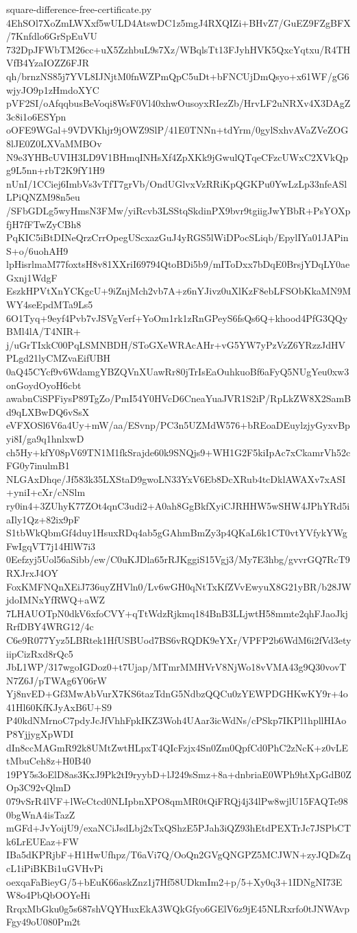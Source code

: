 \documentclass[11pt]{article}
\theoremstyle{definition}
\theoremstyle{remark}
\begin{document}
\begin{filecontents*}[overwrite]{square-difference-free-certificate.py}
4EhSOl7XoZmLWXxf5wULD4AtswDC1z5mgJ4RXQIZi+BHvZ7/GuEZ9FZgBFX/7Knfdlo6GrSpEuVU
732DpJFWbTM26cc+uX5ZzhbuL9s7Xz/WBqlsTt13FJyhHVK5QxcYqtxu/R4THVfB4YzaIOZZ6FJR
qh/brnzNS85j7YVL8IJNjtM0fnWZPmQpC5uDt+bFNCUjDmQsyo+x61WF/gG6wjyJO9p1zHmdoXYC
pVF2SI/oAfqqbusBeVoqi8WsF0Vl40xhwOusoyxRIezZb/HrvLF2uNRXv4X3DAgZ3c8i1o6ESYpn
oOFE9WGal+9VDVKhjr9jOWZ9SlP/41E0TNNn+tdYrm/0gylSxhvAVaZVeZOG8lJE0Z0LXVaMMBOv
N9e3YHBcUVIH3LD9V1BHmqINHsXf4ZpXKk9jGwulQTqeCFzcUWxC2XVkQpg9L5nn+rbT2K9fY1H9
nUnI/1CCiej6ImbVs3vTfT7grVb/OndUGlvxVzRRiKpQGKPu0YwLzLp33nfeASlLPiQNZM98n5eu
/SFbGDLg5wyHmsN3FMw/yiRcvb3LSStqSkdinPX9bvr9tgiigJwYBbR+PsYOXpfjH7fFTwZyCBh8
PqKIC5iBtDINeQrzCrrOpegUScxazGuJ4yRGS5lWiDPocSLiqb/EpylIYa01JAPinS+o/6uohAH9
lpHisrlmaM77foxtsH8v81XXriI69794QtoBDi5b9/mIToDxx7bDqE0BrsjYDqLY0aeGxnj1WdgF
EszkHPVtXnYCKgcU+9iZnjMch2vb7A+z6nYJivz0uXlKzF8ebLFSObKkaMN9MWY4seEpdMTa9Ls5
6O1Tyq+9eyf4Pvb7vJSVgVerf+YoOm1rk1zRnGPeyS6fsQs6Q+khood4PfG3QQyBMl4lA/T4NIR+
j/uGrTIxkC00PqLSMNBDH/SToGXeWRAcAHr+vG5YW7yPzVzZ6YRzzJdHVPLgd21lyCMZvaEifUBH
0aQ45CYcf9v6WdamgYBZQVnXUawRr80jTrIsEaOuhkuoBf6aFyQ5NUgYeu0xw3onGoydOyoH6cbt
awabnCiSPFiysP89TgZo/PmI54Y0HVcD6CneaYuaJVR1S2iP/RpLkZW8X2SamBd9qLXBwDQ6vSsX
eVFXOSl6V6a4Uy+mW/aa/ESvnp/PC3n5UZMdW576+bREoaDEuylzjyGyxvBpyi8I/ga9q1hnlxwD
ch5Hy+kfY08pV69TN1M1fkSrajde60k9SNQjs9+WH1G2F5kiIpAc7xCkamrVh52cFG0y7inulmB1
NLGAxDhqe/Jf583k35LXStaD9gwoLN33YxV6Eb8DcXRub4tcDklAWAXv7xASI+yniI+cXr/cNSlm
ry0in4+3ZUhyK77ZOt4qnC3udi2+A0ah8GgBkfXyiCJRHHW5wSHW4JPhYRd5iaIly1Qz+82ix9pF
S1tbWkQbmGf4duy1HsuxRDq4ab5gGAhmBmZy3p4QKaL6k1CT0vtYVfykYWgFwIgqVT7j14HlW7i3
0Eefzyj5Uol56aSibb/ew/C0uKJDla65rRJKggiS15Vgj3/My7E3hbg/gvvrGQ7RcT9RXJrxJ4OY
FoxKMFNQnXEiJ736uyZHVln0/Lv6wGH0qNtTxKfZVvEwyuX8G21yBR/b28JWjdoIMNxYfRWQ+aWZ
7LHAUOTpN0dkV6xfoCVY+qTtWdzRjkmq184BnB3LLjwtH58mmte2qhFJaoJkjRrfDBY4WRG12/4c
C6e9R077Yyz5LBRtek1HfUSBUod7BS6vRQDK9eYXr/VPFP2b6WdM6i2fVd3etyiipCizRxd8rQc5
JbL1WP/317wgoIGDoz0+t7Ujap/MTmrMMHVrV8NjWo18vVMA43g9Q30vovTN7Z6J/pTWAg6Y06rW
Yj8nvED+Gf3MwAbVurX7KS6tazTdnG5NdbzQQCu0zYEWPDGHKwKY9r+4o41Hl60KfKJyAxB6U+S9
P40kdNMrnoC7pdyJcJfVhhFpkIKZ3Woh4UAar3icWdNs/cPSkp7IKPl1hpllHIAoP8YjjygXpWDI
dIn8ccMAGmR92k8UMtZwtHLpxT4QIcFzjx4Sn0Zm0QpfCd0PhC2zNcK+z0vLEtMbuCeh8z+H0B40
19PY5s3oElD8as3KxJ9Pk2tI9ryybD+lJ249sSmz+8a+dnbriaE0WPh9htXpGdB0ZOp3C92vQlmD
079vSrR4lVF+lWeCtcd0NLIpbnXPO8qmMR0tQiFRQj4j34lPw8wjlU15FAQTe980bgWnA4isTazZ
mGFd+JvYoijU9/exaNCiJsdLbj2xTxQShzE5PJah3iQZ93hEtdPEXTrJc7JSPbCTk6LrEUEaz+FW
IBa5dKPRjbF+H1HwUfhpz/T6aVi7Q/OoQn2GVgQNGPZ5MCJWN+zyJQDsZqcL1iPiBKBi1uGVHvPi
oexqaFaBieyG/5+bEuK66askZnz1j7Hf58UDkmIm2+p/5+Xy0q3+1IDNgNI73EW8o4PbQbOOYeHi
RrqxMbGku0g5s687shVQYHuxEkA3WQkGfyo6GElV6z9jE45NLRxrfo0tJNWAvpFgy49oU080Pm2t

\end{filecontents*}
\end{document}
